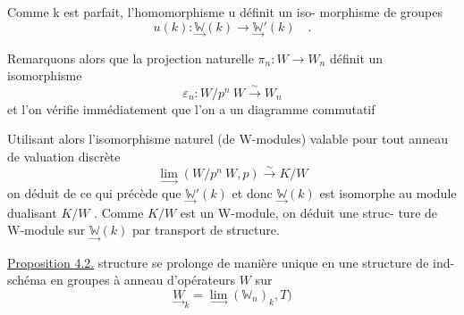 Comme k est parfait, l'homomorphisme u définit un iso-%
morphisme de groupes
\[ u(k) : \underset{\rightarrow}{\mathbb{W}}(k) \rightarrow \underset{\rightarrow}{\mathbb{W}}'(k) \quad . \]

Remarquons alors que la projection naturelle $\pi_n : W \rightarrow W_n$
définit un isomorphisme
\[ \varepsilon_n : W/p^n\ W \overset{\sim}{\rightarrow} W_n \]
et l'on vérifie immédiatement que l'on a un diagramme commutatif

Utilisant alors l'isomorphisme naturel (de W-modules) valable pour tout
anneau de valuation discrète
\[ \underset{\rightarrow}{\lim}(W/p^n\ W,p) \overset{\sim}{\rightarrow} K/W \]
on déduit de ce qui précède que $\underset{\rightarrow}{\mathbb{W}}'(k)$ et donc $\underset{\rightarrow}{\mathbb{W}}(k)$ est isomorphe au
module dualisant $K/W$ . Comme $K/W$ est un W-module, on déduit une struc-%
ture de W-module sur $\underset{\rightarrow}{\mathbb{W}}(k)$ par transport de structure.

\uline{Proposition 4.2.}  structure se prolonge de manière unique en une
structure de ind-schéma en groupes à anneau d'opérateurs $W$ sur
\[ \underset{\rightarrow}{W}_k = \underset{\rightarrow}{\lim}(\mathbb{W}_n)_k, T) \]

